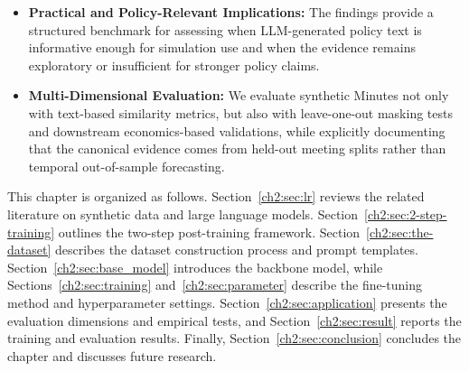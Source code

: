 \begin{itemize}
\item[] \textbf{Practical and Policy-Relevant Implications:} The findings provide a structured benchmark for assessing when LLM-generated policy text is informative enough for simulation use and when the evidence remains exploratory or insufficient for stronger policy claims.

\item[] \textbf{Multi-Dimensional Evaluation:} We evaluate synthetic Minutes not only with text-based similarity metrics, but also with leave-one-out masking tests and downstream economics-based validations, while explicitly documenting that the canonical evidence comes from held-out meeting splits rather than temporal out-of-sample forecasting.
\end{itemize}

This chapter is organized as follows. Section~\ref{ch2:sec:lr} reviews the related literature on synthetic data and large language models. Section~\ref{ch2:sec:2-step-training} outlines the two-step post-training framework. Section~\ref{ch2:sec:the-dataset} describes the dataset construction process and prompt templates. Section~\ref{ch2:sec:base_model} introduces the backbone model, while Sections~\ref{ch2:sec:training} and~\ref{ch2:sec:parameter} describe the fine-tuning method and hyperparameter settings. Section~\ref{ch2:sec:application} presents the evaluation dimensions and empirical tests, and Section~\ref{ch2:sec:result} reports the training and evaluation results. Finally, Section~\ref{ch2:sec:conclusion} concludes the chapter and discusses future research.
